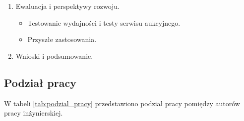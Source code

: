 \begin{enumerate}
        \begin{itemize}
          \item Opis sposobu włączenia komponentu renderującego do interfejsu użytkownika.
        \end{itemize}
  \item Ewaluacja i perspektywy rozwoju.
        \begin{itemize}
          \item Testowanie wydajności i testy serwisu aukcyjnego.
          \item Przyszłe zastosowania.
        \end{itemize}
  \item Wnioski i podsumowanie.
\end{enumerate}

\subsection{Podział pracy}

W tabeli \ref{tab:podzial_pracy} przedstawiono podział pracy pomiędzy autorów pracy inżynierskiej.

